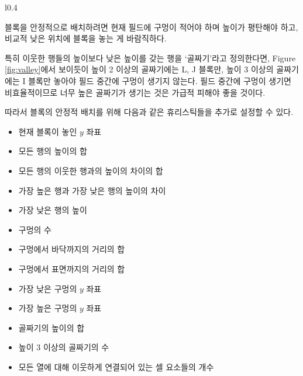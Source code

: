 \begin{wrapfigure}{l}{0.4\textwidth}
    \caption{깊이 2의 골짜기}
    \label{fig:valley}
\end{wrapfigure}

블록을 안정적으로 배치하려면 현재 필드에 구멍이 적어야 하며 높이가 평탄해야 하고, 비교적 낮은 위치에 블록을
놓는 게 바람직하다.

특히 이웃한 행들의 높이보다 낮은 높이를 갖는 행을 `골짜기'라고 정의한다면,
Figure \ref{fig:valley}에서 보이듯이 높이 2 이상의 골짜기에는 L, J 블록만, 높이 3 이상의 골짜기에는
I 블록만 놓아야 필드 중간에 구멍이 생기지 않는다.
필드 중간에 구멍이 생기면 비효율적이므로 너무 높은 골짜기가 생기는 것은 가급적 피해야 좋을 것이다.

따라서 블록의 안정적 배치를 위해 다음과 같은 휴리스틱들을 추가로 설정할 수 있다.

\begin{itemize}
    \item 현재 블록이 놓인 $y$ 좌표
    \item 모든 행의 높이의 합
    \item 모든 행의 이웃한 행과의 높이의 차이의 합
    \item 가장 높은 행과 가장 낮은 행의 높이의 차이
    \item 가장 낮은 행의 높이
    \item 구멍의 수
    \item 구멍에서 바닥까지의 거리의 합
    \item 구멍에서 표면까지의 거리의 합
    \item 가장 낮은 구멍의 $y$ 좌표
    \item 가장 높은 구멍의 $y$ 좌표
    \item 골짜기의 높이의 합
    \item 높이 3 이상의 골짜기의 수
    \item 모든 열에 대해 이웃하게 연결되어 있는 셀 요소들의 개수
\end{itemize}

